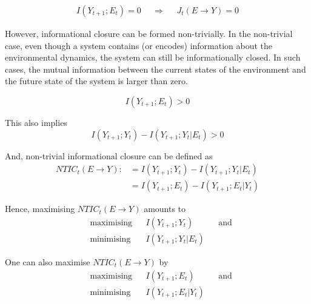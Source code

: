 \documentclass[utf8]{article}
\begin{document}
				\begin{equation}
				\begin{aligned}
				{I(Y_{t+1};E_{t})=0}&&{\Rightarrow}&&{J_{t}(E \rightarrow Y )=0}
				\end{aligned}
				\end{equation}


			\noindent
			However, informational closure can be formed non-trivially. In the non-trivial case, even though a system contains (or encodes) information about the environmental dynamics, the system can still be informationally closed. In such cases, the mutual information between the current states of the environment and the future state of the system is larger than zero.

				\begin{equation}
				I(Y_{t+1};E_{t}) > 0
				\end{equation}

			\noindent
			This also implies
				\begin{equation}
					I(Y_{t+1};Y_{t})-I(Y_{t+1};Y_{t}|E_{t}) > 0
				\end{equation}



			\noindent
			And, non-trivial informational closure can be defined as
				\begin{align}
				\label{eq:NTIC}
    				NTIC_t(E\rightarrow Y) :&=I(Y_{t+1};Y_{t})-I(Y_{t+1};Y_{t}|E_{t})\\
    				&=I(Y_{t+1};E_{t})-I(Y_{t+1};E_{t}|Y_{t})
				\end{align}
			

			\noindent
			Hence, maximising $NTIC_t(E\rightarrow Y)$ amounts to
				\begin{equation}
    				\label{eq:nticObjective}
    				\begin{aligned}
    				& \text{maximising} & { } & I(Y_{t+1};Y_{t}) & { } & \text{and} \\
    				& \text{minimising} & { } & I(Y_{t+1};Y_{t}|E_{t}) & { }
    				\end{aligned}
				\end{equation}
			
			\noindent
			One can also maximise $NTIC_t(E\rightarrow Y)$ by 
				\begin{equation}
    				\label{eq:nticObjective2}
    				\begin{aligned}
    				& \text{maximising} & { } & I(Y_{t+1};E_{t}) & { } & \text{and} \\
    				& \text{minimising} & { } & I(Y_{t+1};E_{t}|Y_{t}) & { }
    				\end{aligned}
				\end{equation}			
\end{document}
